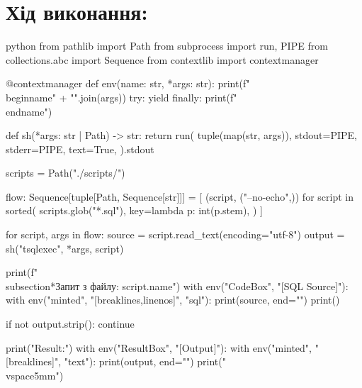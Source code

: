 \documentclass{article}
\begin{document}
    \section*{Хід виконання:}
    \begin{sciffi}{python}
        from pathlib import Path
        from subprocess import run, PIPE
        from collections.abc import Sequence
        from contextlib import contextmanager
        
        @contextmanager
        def env(name: str, *args: str):
            print(f"\\begin{{{name}}}" + "".join(args))
            try:
                yield
            finally:
                print(f"\\end{{{name}}}")

        def sh(*args: str | Path) -> str:
            return run(
                tuple(map(str, args)),
                stdout=PIPE,
                stderr=PIPE,
                text=True,
            ).stdout

        scripts = Path("./scripts/")

        flow: Sequence[tuple[Path, Sequence[str]]] = [
            (script, ("--no-echo",))
            for script in sorted(
                scripts.glob("*.sql"),
                key=lambda p: int(p.stem),
            )
        ]

        for script, args in flow:
            source = script.read_text(encoding="utf-8")
            output = sh("tsqlexec", *args, script)

            print(f"\\subsection*{{Запит з файлу: {script.name}}}")
            with env("CodeBox", "[SQL Source]"):
                with env("minted", "[breaklines,linenos]", "{sql}"):
                    print(source, end="")
            print()

            if not output.strip():
                continue

            print("Result:")
            with env("ResultBox", "[Output]"):
                with env("minted", "[breaklines]", "{text}"):
                    print(output, end="")
            print("\\vspace{5mm}")
    \end{sciffi}

    \newpage
\end{document}
